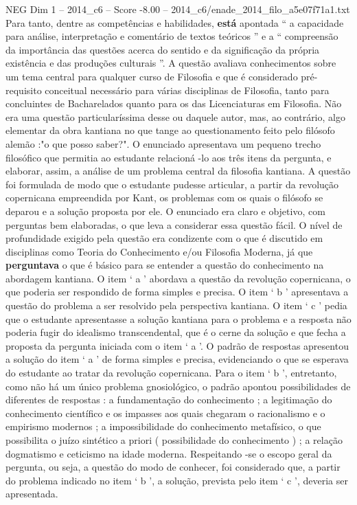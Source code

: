\begin{textsample}{NEG Dim 1 – 2014\_c6 – Score -8.00 – 2014\_c6/enade\_2014\_filo\_a5e07f71a1.txt}
Para tanto, dentre as competências e habilidades, \textbf{está} apontada “ a capacidade para análise, interpretação e comentário de textos teóricos ” e a “ compreensão da importância das questões acerca do sentido e da significação da própria existência e das produções culturais ”.
A questão avaliava conhecimentos sobre um tema central para qualquer curso de Filosofia e que é considerado pré-requisito conceitual necessário para várias disciplinas de Filosofia, tanto para concluintes de Bacharelados quanto para os das Licenciaturas em Filosofia.
Não era uma questão particularíssima desse ou daquele autor, mas, ao contrário, algo elementar da obra kantiana no que tange ao questionamento feito pelo filósofo alemão :"o que posso saber?".
O enunciado apresentava um pequeno trecho filosófico que permitia ao estudante relacioná -lo aos três itens da pergunta, e elaborar, assim, a análise de um problema central da filosofia kantiana.
A questão foi formulada de modo que o estudante pudesse articular, a partir da revolução copernicana empreendida por Kant, os problemas com os quais o filósofo se deparou e a solução proposta por ele.
O enunciado era claro e objetivo, com perguntas bem elaboradas, o que leva a considerar essa questão fácil.
O nível de profundidade exigido pela questão era condizente com o que é discutido em disciplinas como Teoria do Conhecimento e/ou Filosofia Moderna, já que \textbf{perguntava} o que é básico para se entender a questão do conhecimento na abordagem kantiana.
O item ‘ a ’ abordava a questão da revolução copernicana, o que poderia ser respondido de forma simples e precisa.
O item ‘ b ’ apresentava a questão do problema a ser resolvido pela perspectiva kantiana.
O item ‘ c ’ pedia que o estudante apresentasse a solução kantiana para o problema e a resposta não poderia fugir do idealismo transcendental, que é o cerne da solução e que fecha a proposta da pergunta iniciada com o item ‘ a ’.
O padrão de respostas apresentou a solução do item ‘ a ’ de forma simples e precisa, evidenciando o que se esperava do estudante ao tratar da revolução copernicana.
Para o item ‘ b ’, entretanto, como não há um único problema gnosiológico, o padrão apontou possibilidades de diferentes de respostas : a fundamentação do conhecimento ; a legitimação do conhecimento científico e os impasses aos quais chegaram o racionalismo e o empirismo modernos ; a impossibilidade do conhecimento metafísico, o que possibilita o juízo sintético a priori ( possibilidade do conhecimento ) ; a relação dogmatismo e ceticismo na idade moderna.
Respeitando -se o escopo geral da pergunta, ou seja, a questão do modo de conhecer, foi considerado que, a partir do problema indicado no item ‘ b ’, a solução, prevista pelo item ‘ c ’, deveria ser apresentada.

\end{textsample}
